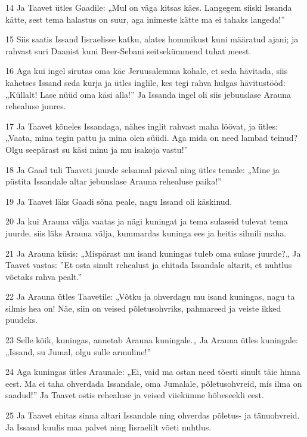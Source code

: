\par 14 Ja Taavet ütles Gaadile: „Mul on väga kitsas käes. Langegem siiski Issanda kätte, sest tema halastus on suur, aga inimeste kätte ma ei tahaks langeda!”
\par 15 Siis saatis Issand Iisraelisse katku, alates hommikust kuni määratud ajani; ja rahvast suri Daanist kuni Beer-Sebani seitsekümmend tuhat meest.
\par 16 Aga kui ingel sirutas oma käe Jeruusalemma kohale, et seda hävitada, siis kahetses Issand seda kurja ja ütles inglile, kes tegi rahva hulgas hävitustööd: „Küllalt! Lase nüüd oma käsi alla!” Ja Issanda ingel oli siis jebuuslase Arauna rehealuse juures.
\par 17 Ja Taavet kõneles Issandaga, nähes inglit rahvast maha löövat, ja ütles: „Vaata, mina tegin pattu ja mina olen süüdi. Aga mida on need lambad teinud? Olgu seepärast su käsi minu ja mu isakoja vastu!”
\par 18 Ja Gaad tuli Taaveti juurde selsamal päeval ning ütles temale: „Mine ja püstita Issandale altar jebuuslase Arauna rehealuse paika!”
\par 19 Ja Taavet läks Gaadi sõna peale, nagu Issand oli käskinud.
\par 20 Ja kui Arauna välja vaatas ja nägi kuningat ja tema sulaseid tulevat tema juurde, siis läks Arauna välja, kummardas kuninga ees ja heitis silmili maha.
\par 21 Ja Arauna küsis: „Mispärast mu isand kuningas tuleb oma sulase juurde?„ Ja Taavet vastas: ”Et osta sinult rehealust ja ehitada Issandale altarit, et nuhtlus võetaks rahva pealt.”
\par 22 Ja Arauna ütles Taavetile: „Võtku ja ohverdagu mu isand kuningas, nagu ta silmis hea on! Näe, siin on veised põletusohvriks, pahmareed ja veiste ikked puudeks.
\par 23 Selle kõik, kuningas, annetab Arauna kuningale.„ Ja Arauna ütles kuningale: „Issand, su Jumal, olgu sulle armuline!”
\par 24 Aga kuningas ütles Araunale: „Ei, vaid ma ostan need tõesti sinult täie hinna eest. Ma ei taha ohverdada Issandale, oma Jumalale, põletusohvreid, mis ilma on saadud!” Ja Taavet ostis rehealuse ja veised viiekümne hõbeseekli eest.
\par 25 Ja Taavet ehitas sinna altari Issandale ning ohverdas põletus- ja tänuohvreid. Ja Issand kuulis maa palvet ning Iisraelilt võeti nuhtlus.



